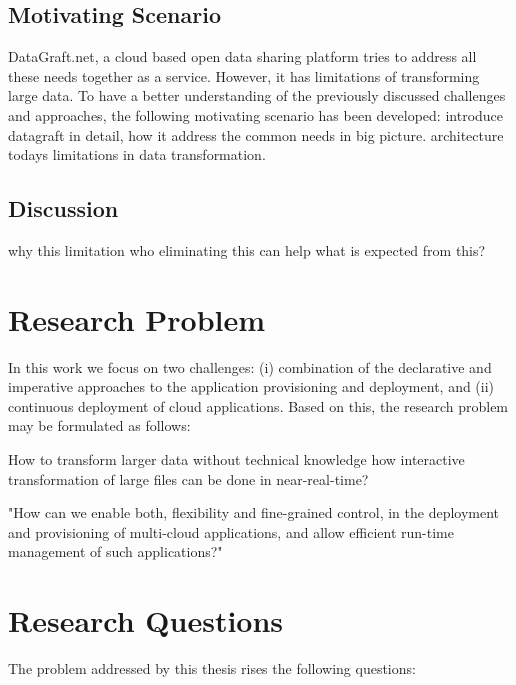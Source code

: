 \subsection{Motivating Scenario}
DataGraft.net, a cloud based open data sharing platform tries to address all these needs together as a service. However, it has limitations of transforming large data.
\noindent To have a better understanding of the previously discussed challenges and approaches, the following motivating scenario has been developed: 
introduce datagraft in detail, how it address the common needs in big picture. 
architecture
todays limitations in data transformation.



\subsection{Discussion}
\label{sec:Discussion}
why this limitation
who eliminating this can help 
what is expected from this?


\section{Research Problem}

\noindent In this work we focus on two challenges: (i) combination of the declarative and imperative approaches to the application provisioning and deployment, and (ii) continuous deployment of cloud applications. Based on this, the research problem may be formulated as follows: 

How to transform larger data without technical knowledge
how interactive transformation of large files can be done in near-real-time?

\begin{center}
"How can we enable both, flexibility and fine-grained control, in the deployment and provisioning of multi-cloud applications, and allow efficient run-time management of such applications?"
\end{center}

\section{Research Questions} 

\noindent The problem addressed by this thesis rises the following questions:


